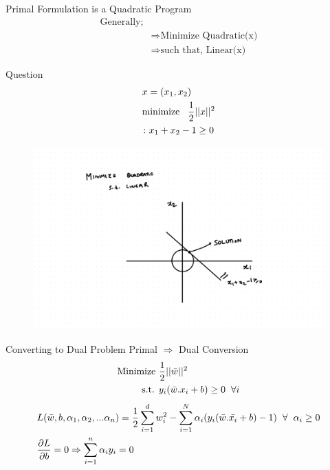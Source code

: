 \documentclass{beamer}
\begin{document}
\begin{frame}{Primal Formulation is a Quadratic Program}
\begin{align*}
\text{Generally;}&\\
&\Rightarrow \text{Minimize Quadratic(x)}\\
&\Rightarrow \text{such that, Linear(x)}
\end{align*}
\begin{multicols}{2}
\begin{tcolorbox}
Question
\begin{align*}
&{x} = (x_{1}, x_{2})\\
&\text{minimize} \hspace{3mm} \frac{1}{2}||x||^{2}\\
&\colon x_{1} + x_{2} - 1 \geq 0
\end{align*}
\end{tcolorbox}
\begin{figure}
\includegraphics[scale=0.3]{SVM/Svm-28.pdf}
\end{figure}
\end{multicols}
\end{frame}

\begin{frame}{Converting to Dual Problem}
Primal $\Rightarrow$ Dual Conversion\\
\begin{align*}
	\text{Minimize } & \frac{1}{2}||\bar{w}||^{2} \\
	\text{s.t. } & y_{i}(\bar{w}.x_{i} + b) \geq 0 \hspace{2mm}\forall i
	\end{align*}
\begin{align*}
&L(\bar{w},b,\alpha_{1},\alpha_{2},...\alpha_{n}) = \frac{1}{2}
\sum_{i = 1}^{d} w_{i}^{2} - \sum_{i=1}^{N} \alpha_{i}(y_{i}(\bar{w}.\bar{x_{i}} + b) - 1) \hspace{2mm} \forall \hspace{2mm}\alpha_{i} \geq 0\\
&\frac{\partial L}{\partial b} = 0 \Rightarrow \sum_{i=1}^{n}\alpha_{i}y_{i} = 0\\
\end{align*}
\end{frame}
\end{document}
